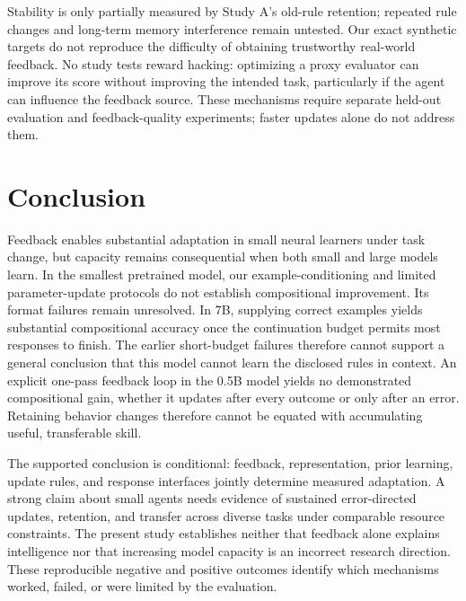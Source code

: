 \documentclass[11pt]{article}
\begin{document}
Stability is only partially measured by Study A's old-rule retention; repeated
rule changes and long-term memory interference remain untested. Our exact
synthetic targets do not reproduce the difficulty of obtaining trustworthy
real-world feedback. No study tests reward hacking: optimizing a proxy evaluator
can improve its score without improving the intended task, particularly if the
agent can influence the feedback source. These mechanisms require separate
held-out evaluation and feedback-quality experiments; faster updates alone do
not address them.

\section{Conclusion}
Feedback enables substantial adaptation in small neural learners under task
change, but capacity remains consequential when both small and large models
learn. In the smallest pretrained model, our example-conditioning and limited
parameter-update protocols do not establish compositional improvement. Its
format failures remain unresolved. In 7B, supplying correct examples yields
substantial compositional accuracy once the continuation budget permits most
responses to finish. The earlier short-budget failures therefore cannot support
a general conclusion that this model cannot learn the disclosed rules in context.
An explicit one-pass feedback loop in the 0.5B model yields no demonstrated
compositional gain, whether it updates after every outcome or only after an
error. Retaining behavior changes therefore cannot be equated with accumulating
useful, transferable skill.

The supported conclusion is conditional: feedback, representation, prior
learning, update rules, and response interfaces jointly determine measured
adaptation. A strong claim about small agents needs evidence of sustained
error-directed updates, retention, and transfer across diverse tasks under
comparable resource constraints. The present study establishes neither that
feedback alone explains intelligence nor that increasing model capacity is an
incorrect research direction. These reproducible negative and positive outcomes
identify which mechanisms worked, failed, or were limited by the evaluation.
\end{document}
